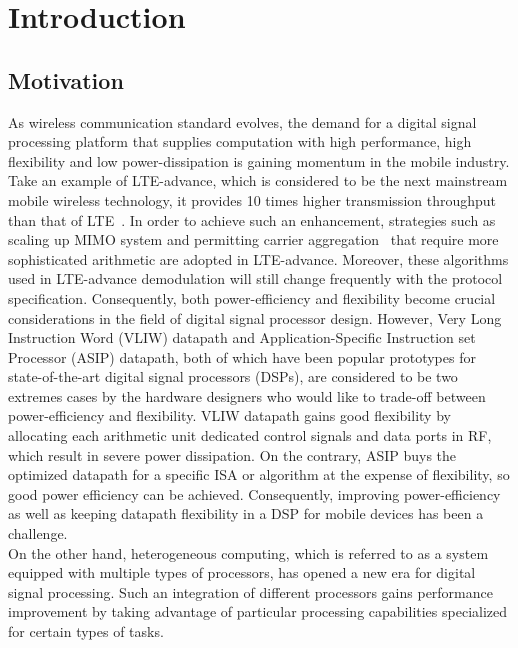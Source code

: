 \chapter{Introduction}

    \section{Motivation}
        As wireless communication standard evolves, the demand for a digital signal processing platform that supplies computation with high performance, high flexibility and low power-dissipation is gaining momentum in the mobile industry. 
        Take an example of LTE-advance, which is considered to be the next mainstream mobile wireless technology, it provides 10 times higher transmission throughput than that of LTE~\cite{lte}. 
        In order to achieve such an enhancement, strategies such as scaling up MIMO system and permitting carrier aggregation~\cite{carrier} that require more sophisticated arithmetic are adopted in LTE-advance.
        Moreover, these algorithms used in LTE-advance demodulation will still change frequently with the protocol specification.
        Consequently, both power-efficiency and flexibility become crucial considerations in the field of digital signal processor design. 
        However, Very Long Instruction Word (VLIW) datapath and Application-Specific Instruction set Processor (ASIP) datapath, both of which have been popular prototypes for state-of-the-art digital signal processors (DSPs), are considered to be two extremes cases by the hardware designers who would like to trade-off between power-efficiency and flexibility. 
        VLIW datapath gains good flexibility by allocating each arithmetic unit dedicated control signals and data ports in RF, which result in severe power dissipation. %
        On the contrary, ASIP buys the optimized datapath for a specific ISA or algorithm at the expense of flexibility, so good power efficiency can be achieved. 
        Consequently, improving power-efficiency as well as keeping datapath flexibility in a DSP for mobile devices has been a challenge.	
        \\\indent 
        On the other hand, heterogeneous computing, which is referred to as a system equipped with multiple types of processors, has opened a new era for digital signal processing. 
        Such an integration of different processors gains performance improvement by taking advantage of particular processing capabilities specialized for certain types of tasks.
